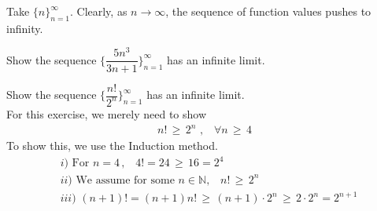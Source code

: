 \begin{example}
Take $\{n\}_{n=1}^{\infty}$. Clearly, as $n \longrightarrow \infty$, the sequence of function values pushes to infinity.
\end{example}

\begin{exercise}
Show the sequence $\Big\{\dfrac{5n^{3}}{3n+1}\Big\}_{n=1}^{\infty}$ has an infinite limit. 
\end{exercise}

\begin{exercise}\label{exercise_4_ch_2}
Show the sequence $\Big\{\dfrac{n!}{2^{n}}\Big\}_{n=1}^{\infty}$ has an infinite limit.\\[1ex]
For this exercise, we merely need to show 
\begin{align*}
    n! \hspace{2pt} \geq \hspace{2pt} 2^{n} \hspace{4pt}, \hspace{10pt} \forall n \hspace{2pt} \geq \hspace{2pt} 4
\end{align*}
To show this, we use the Induction method. 
\begin{align*}
    &i) \hspace{4pt} \text{For} \hspace{4pt} n = 4 \hspace{2pt}, \hspace{10pt} 4! = 24 \hspace{2pt} \geq \hspace{2pt} 16 = 2^{4}\\[2ex]
    &ii) \hspace{4pt} \text{We assume for some} \hspace{4pt} n \in \mathbb{N}, \hspace{10pt} n! \hspace{2pt} \geq \hspace{2pt} 2^{n}\\[2ex]
    &iii) \hspace{4pt} (n+1)! = (n+1)n! \hspace{2pt} \geq \hspace{2pt} (n+1) \cdot 2^{n} \hspace{2pt} \geq \hspace{2pt} 2 \cdot 2^{n} = 2^{n+1}
\end{align*}
\end{exercise}



